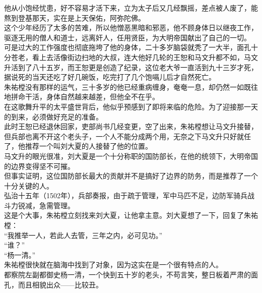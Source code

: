 \begin{multicols}{\theparacolNo}
他从小饱经忧患，好不容易才活下来，立为太子后又几经飘摇，差点被人废了，能熬到登基那天，实在是上天保佑，阿弥陀佛。\\

这个少年经历了太多的苦难，所以他憎恶黑暗和邪恶，他不顾身体日以继夜工作，驱逐无用的僧人和道士，远离奸人，任用贤臣，为大明帝国献出了自己的一切。\\

可是过大的工作强度也彻底拖垮了他的身体，二十多岁脑袋就秃了一大半，面孔十分苍老，看上去活像街边扫地的大叔，连大他好几轮的王恕和马文升都不如，马文升活到了八十五岁，而王恕更是创造了纪录，这位老大爷一直活到九十三岁才死，据说死的当天还吃了好几碗饭，吃完打了几个饱嗝儿后才自然死亡。\\

朱祐樘没有那样的运气，三十多岁的他已经重病缠身，奄奄一息，却仍然一如既往地拼命干活，身体自然越来越差，但他全不在乎。\\

在这歌舞升平的太平盛世背后，他似乎预感到了即将来临的危险。为了迎接那一天的到来，必须做好充足的准备。\\

此时王恕已经退休回家，吏部尚书几经变更，空了出来，朱祐樘想让马文升接替，但兵部也离不开这个老头子，一个人不能分成两个用，无奈之下马文升只好就任了，他推荐一个叫刘大夏的人接替了他的位置。\\

马文升的眼光很准，刘大夏是一个十分称职的国防部长，在他的统领下，大明帝国的边界变得坚不可摧。\\

但事实证明，这位国防部长最大的贡献并不是搞好了边界的防务，而是推荐了一个十分关键的人。\\

弘治十五年（1502年），兵部奏报，由于疏于管理，军中马匹不足，边防军骑兵战斗力锐减，急需管理。\\

这是个大事，朱祐樘立刻找来刘大夏，让他拿主意。刘大夏想了一下，回复了朱祐樘：\\

“我推举一人，若此人去管，三年之内，必可见功。”\\

“谁？”\\

“杨一清。”\\

朱祐樘很快就在脑海中找到了对象，因为这实在是一个很有特点的人。\\

都察院左副都御史杨一清，一个快到五十岁的老头，不苟言笑，整日板着严肃的面孔，而且相貌出众——比较丑。\\


\end{multicols}
